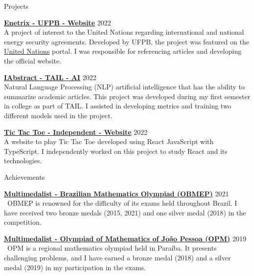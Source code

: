 \documentclass{resume} %
\begin{document}
\begin{rSection}{Projects}

\item \textbf{\href{https://enetrix.ufpb.br/}{Enetrix - UFPB - Website}} \hfill 2022 \\
A project of interest to the United Nations regarding international and national energy security agreements. Developed by UFPB, the project was featured on the \href{https://www.un.org/en/academic-impact/insights-energy-diplomacy-and-un-data-intensive-research-brazilian-universities}{United Nations} portal. I was responsible for referencing articles and developing the official website.

\item \textbf{\href{https://github.com/ralfferreira/generate-abstract}{IAbstract - TAIL - AI}} \hfill 2022 \\
Natural Language Processing (NLP) artificial intelligence that has the ability to summarize academic articles. This project was developed during my first semester in college as part of TAIL. I assisted in developing metrics and training two different models used in the project.

\item \textbf{\href{https://georgepaulino.github.io/TicTacToe/}{Tic Tac Toe - Independent - Website}} \hfill 2022 \\
A website to play Tic Tac Toe developed using React JavaScript with TypeScript. I independently worked on this project to study React and its technologies.

\end{rSection}


\begin{rSection}{Achievements}

\item \textbf{\href{http://www.obmep.org.br/}{Multimedalist - Brazilian Mathematics Olympiad (OBMEP)}} \hfill 2021 \
OBMEP is renowned for the difficulty of its exams held throughout Brazil. I have received two bronze medals (2015, 2021) and one silver medal (2018) in the competition.

\item \textbf{\href{http://www.mat.ufpb.br/opm/}{Multimedalist - Olympiad of Mathematics of João Pessoa (OPM)}} \hfill 2019 \
OPM is a regional mathematics olympiad held in Paraíba. It presents challenging problems, and I have earned a bronze medal (2018) and a silver medal (2019) in my participation in the exams.

\end{rSection}
\end{document}
